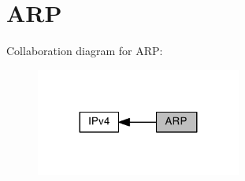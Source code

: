 \hypertarget{group__lwip__opts__arp}{}\section{A\+RP}
\label{group__lwip__opts__arp}
Collaboration diagram for A\+RP\+:
\nopagebreak
\begin{figure}[H]
\begin{center}
\leavevmode
\includegraphics[width=191pt]{group__lwip__opts__arp}
\end{center}
\end{figure}
